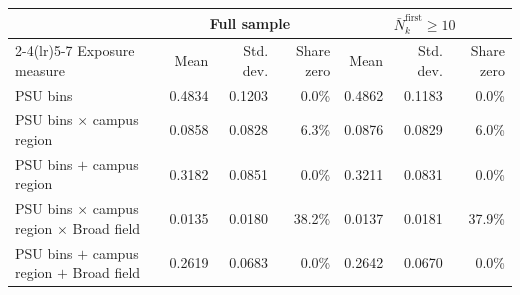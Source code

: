 \begin{tabular}{lrrrrrr}
\toprule
 & \multicolumn{3}{c}{Full sample} & \multicolumn{3}{c}{\(\bar N^{\mathrm{first}}_{k}\geq10\)} \\
\cmidrule(lr){2-4}\cmidrule(lr){5-7}
Exposure measure & Mean & Std. dev. & Share zero & Mean & Std. dev. & Share zero \\
\midrule
PSU bins & 0.4834 & 0.1203 &   0.0\% & 0.4862 & 0.1183 &   0.0\% \\
PSU bins \(\times\) campus region & 0.0858 & 0.0828 &   6.3\% & 0.0876 & 0.0829 &   6.0\% \\
PSU bins \(+\) campus region & 0.3182 & 0.0851 &   0.0\% & 0.3211 & 0.0831 &   0.0\% \\
PSU bins \(\times\) campus region \(\times\) Broad field & 0.0135 & 0.0180 &  38.2\% & 0.0137 & 0.0181 &  37.9\% \\
PSU bins \(+\) campus region \(+\) Broad field & 0.2619 & 0.0683 &   0.0\% & 0.2642 & 0.0670 &   0.0\% \\
\bottomrule
\end{tabular}
